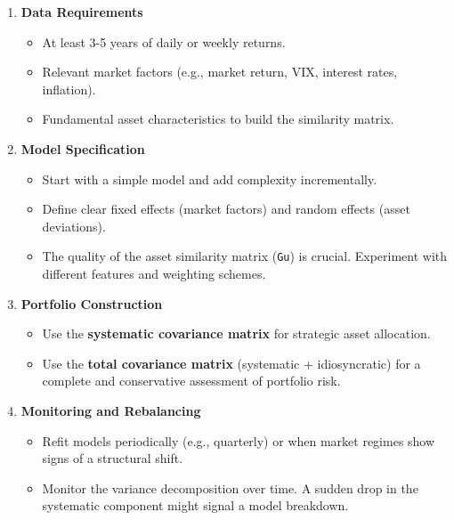 \documentclass[
]{article}
\providecommand{\tightlist}{%
  \setlength{\itemsep}{0pt}\setlength{\parskip}{0pt}}
\begin{document}
\begin{enumerate}
\def\labelenumi{\arabic{enumi}.}
\item
  \textbf{Data Requirements}

  \begin{itemize}
  \tightlist
  \item
    At least 3-5 years of daily or weekly returns.
  \item
    Relevant market factors (e.g., market return, VIX, interest rates,
    inflation).
  \item
    Fundamental asset characteristics to build the similarity matrix.
  \end{itemize}
\item
  \textbf{Model Specification}

  \begin{itemize}
  \tightlist
  \item
    Start with a simple model and add complexity incrementally.
  \item
    Define clear fixed effects (market factors) and random effects
    (asset deviations).
  \item
    The quality of the asset similarity matrix (\texttt{Gu}) is crucial.
    Experiment with different features and weighting schemes.
  \end{itemize}
\item
  \textbf{Portfolio Construction}

  \begin{itemize}
  \tightlist
  \item
    Use the \textbf{systematic covariance matrix} for strategic asset
    allocation.
  \item
    Use the \textbf{total covariance matrix} (systematic +
    idiosyncratic) for a complete and conservative assessment of
    portfolio risk.
  \end{itemize}
\item
  \textbf{Monitoring and Rebalancing}

  \begin{itemize}
  \tightlist
  \item
    Refit models periodically (e.g., quarterly) or when market regimes
    show signs of a structural shift.
  \item
    Monitor the variance decomposition over time. A sudden drop in the
    systematic component might signal a model breakdown.
  \end{itemize}
\end{enumerate}
\end{document}
